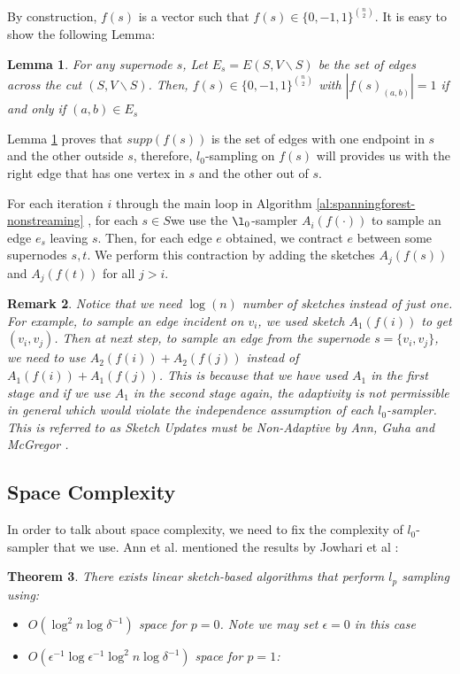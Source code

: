 \documentclass[11pt]{article}
\theoremstyle{plain}
\newtheorem{theorem}{Theorem}[section]
\newtheorem{lemma}[theorem]{Lemma}
\newtheorem{remark}[theorem]{Remark}
\begin{document}
By construction, $f(s)$ is a vector such that $f(s)\in\{0,-1,1\}^{\binom{n}{2}}$. It 
is easy to show the following Lemma:

\begin{lemma}
\label{le:dynamic-conn}
For any supernode $s$, Let $E_s=E(S, V\backslash S)$ be the set of edges 
across the cut $(S, V\backslash S)$. Then, $f(s)\in\{0,-1,1\}^{\binom{n}{2}}$ with 
$|f(s)_{(a,b)}|=1$ if and only if $(a,b)\in E_s$
\end{lemma}

Lemma \ref{le:dynamic-conn} proves that $supp(f(s))$ is the set of edges with 
one endpoint in $s$ and the other 
outside $s$, therefore, $l_0$-sampling on $f(s)$ will provides us with the right 
edge that has one vertex in $s$ and the other out of $s$. 

For each iteration $i$ through the main loop in Algorithm 
\ref{al:spanningforest-nonstreaming} , for each $s\in S$we use the 
$\l_0$-sampler $A_i(f(\cdot))$ to sample an edge $e_s$ leaving $s$. Then, for 
each edge $e$ obtained, we contract $e$ between some supernodes $s, t$. We 
perform this contraction by adding the sketches $A_j(f(s))$ and $A_j(f(t))$ for 
all $j > i$.

\begin{remark}
Notice that we need $\log(n)$ number of sketches instead of just one. For 
example, to sample an edge incident on $v_i$, we used sketch $A_1(f(i))$ to get 
$(v_i, v_j)$. Then 
at next step, to sample an edge from the supernode $s=\{v_i,v_j\}$, we need 
to use $A_2(f(i))+A_2(f(j))$ instead of $A_1(f(i))+A_1(f(j))$. This is because that 
we have used $A_1$ in the first stage and if we use $A_1$ in the second stage 
again, the adaptivity is not permissible in general which would violate the 
independence assumption of each $l_0$-sampler. This is referred to as 
\textit{Sketch Updates must be Non-Adaptive} by Ann, Guha and 
McGregor  \cite{AGM2012-analyzing}. 
\end{remark}

\subsection{Space Complexity}
In order to talk about space complexity, we need to fix the complexity of 
$l_0$-sampler that we use. Ann et al. mentioned the results by Jowhari et al 
\cite{Jowhari11}: 
\begin{theorem}
There exists linear sketch-based algorithms that perform $l_p$ sampling using:
\begin{itemize}
	\item $O(\log^2 n \log \delta^{-1})$ space for $p=0$. Note we may set 
	$\epsilon=0$ in this case
	\item $O(\epsilon^{-1}\log\epsilon^{-1}\log^2 n \log \delta^{-1})$ space for 
	$p=1$: 
\end{itemize}
\end{theorem}
\end{document}
